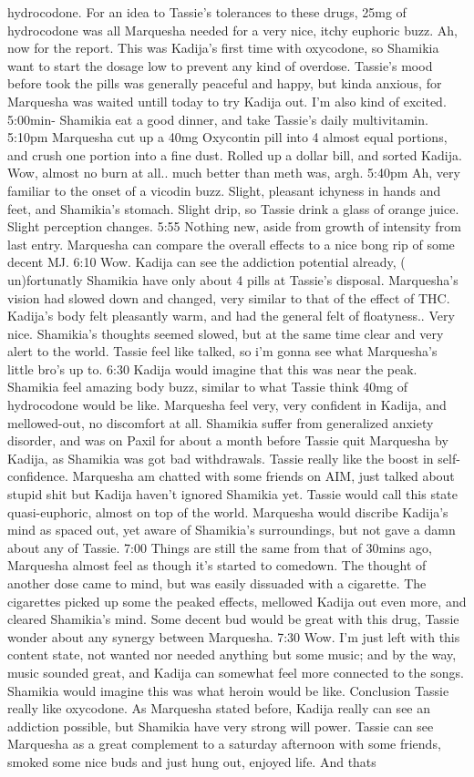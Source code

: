 \documentclass[12pt]{book}
\begin{document}
hydrocodone. For an idea to Tassie's tolerances to these drugs, 25mg of hydrocodone was all Marquesha needed for a very nice, itchy euphoric buzz. Ah, now for the report. This was Kadija's first time with oxycodone, so Shamikia want to start the dosage low to prevent any kind of overdose. Tassie's mood before took the pills was generally peaceful and happy, but kinda anxious, for Marquesha was waited untill today to try Kadija out. I'm also kind of excited. 5:00min- Shamikia eat a good dinner, and take Tassie's daily multivitamin. 5:10pm Marquesha cut up a 40mg Oxycontin pill into 4 almost equal portions, and crush one portion into a fine dust. Rolled up a dollar bill, and sorted Kadija. Wow, almost no burn at all.. much better than meth was, argh. 5:40pm Ah, very familiar to the onset of a vicodin buzz. Slight, pleasant ichyness in hands and feet, and Shamikia's stomach. Slight drip, so Tassie drink a glass of orange juice. Slight perception changes. 5:55 Nothing new, aside from growth of intensity from last entry. Marquesha can compare the overall effects to a nice bong rip of some decent MJ. 6:10 Wow. Kadija can see the addiction potential already, ( un)fortunatly Shamikia have only about 4 pills at Tassie's disposal. Marquesha's vision had slowed down and changed, very similar to that of the effect of THC. Kadija's body felt pleasantly warm, and had the general felt of floatyness.. Very nice. Shamikia's thoughts seemed slowed, but at the same time clear and very alert to the world. Tassie feel like talked, so i'm gonna see what Marquesha's little bro's up to. 6:30 Kadija would imagine that this was near the peak. Shamikia feel amazing body buzz, similar to what Tassie think 40mg of hydrocodone would be like. Marquesha feel very, very confident in Kadija, and mellowed-out, no discomfort at all. Shamikia suffer from generalized anxiety disorder, and was on Paxil for about a month before Tassie quit Marquesha by Kadija, as Shamikia was got bad withdrawals. Tassie really like the boost in self-confidence. Marquesha am chatted with some friends on AIM, just talked about stupid shit but Kadija haven't ignored Shamikia yet. Tassie would call this state quasi-euphoric, almost on top of the world. Marquesha would discribe Kadija's mind as spaced out, yet aware of Shamikia's surroundings, but not gave a damn about any of Tassie. 7:00 Things are still the same from that of 30mins ago, Marquesha almost feel as though it's started to comedown. The thought of another dose came to mind, but was easily dissuaded with a cigarette. The cigarettes picked up some the peaked effects, mellowed Kadija out even more, and cleared Shamikia's mind. Some decent bud would be great with this drug, Tassie wonder about any synergy between Marquesha. 7:30 Wow. I'm just left with this content state, not wanted nor needed anything but some music; and by the way, music sounded great, and Kadija can somewhat feel more connected to the songs. Shamikia would imagine this was what heroin would be like. Conclusion Tassie really like oxycodone. As Marquesha stated before, Kadija really can see an addiction possible, but Shamikia have very strong will power. Tassie can see Marquesha as a great complement to a saturday afternoon with some friends, smoked some nice buds and just hung out, enjoyed life. And thats 
\end{document}
